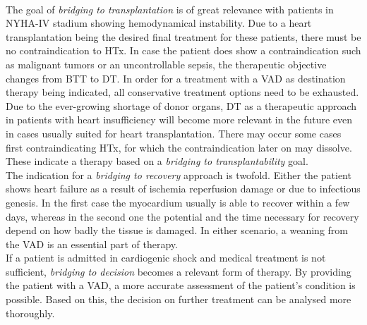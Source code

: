 \\The goal of \textit{bridging to transplantation} is of great relevance with patients in NYHA-IV stadium showing hemodynamical instability. Due to a heart transplantation being the desired final treatment for these patients, there must be no contraindication to HTx. In case the patient does show a contraindication such as malignant tumors or an uncontrollable sepsis, the therapeutic objective changes from BTT to DT. In order for a treatment with a VAD as destination therapy being indicated, all conservative treatment options need to be exhausted. Due to the ever-growing shortage of donor organs, DT as a therapeutic approach in patients with heart insufficiency will become more relevant in the future even in cases usually suited for heart transplantation. \cite{VAD7} There may occur some cases first contraindicating HTx, for which the contraindication later on may dissolve. These indicate a therapy based on a \textit{bridging to transplantability} goal. \cite{VAD6}
\\The indication for a \textit{bridging to recovery} approach is twofold. Either the patient shows heart failure as a result of ischemia reperfusion damage or due to infectious genesis. In the first case the myocardium usually is able to recover within a few days, whereas in the second one the potential and the time necessary for recovery depend on how badly the tissue is damaged. In either scenario, a weaning from the VAD is an essential part of therapy. \cite{VAD7}
\\If a patient is admitted in cardiogenic shock and medical treatment is not sufficient, \textit{bridging to decision} becomes a relevant form of therapy. By providing the patient with a VAD, a more accurate assessment of the patient's condition is possible.
Based on this, the decision on further treatment can be analysed more thoroughly. \cite{VAD6}

